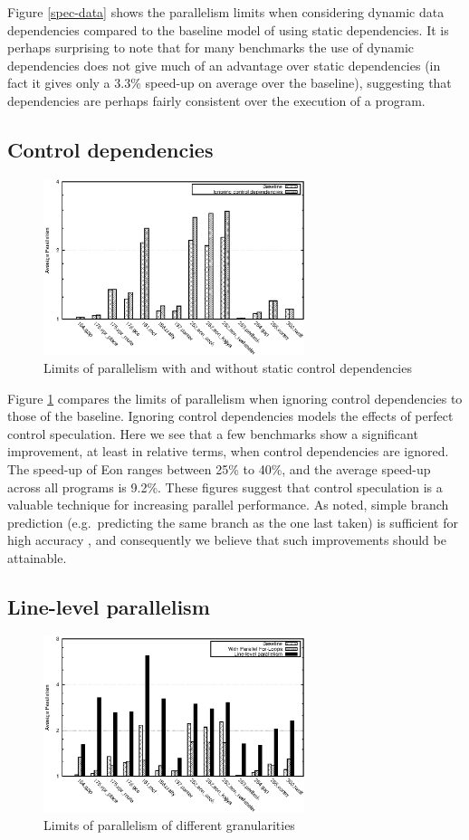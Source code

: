 Figure \ref{spec-data} shows the parallelism limits when considering dynamic data dependencies compared to the baseline model of using static dependencies.
It is perhaps surprising to note that for many benchmarks the use of dynamic dependencies does not give much of an advantage over static dependencies (in fact it gives only a 3.3\% speed-up on average over the baseline), suggesting that dependencies are perhaps fairly consistent over the execution of a program.

\subsection{Control dependencies}

\begin{figure}
 \centering
 \includegraphics[width=3in]{spec-ctl}
 \caption{Limits of parallelism with and without static control dependencies}
 \label{spec-ctl}
\end{figure}

Figure \ref{spec-ctl} compares the limits of parallelism when ignoring control dependencies to those of the baseline.
Ignoring control dependencies models the effects of perfect control speculation.
Here we see that a few benchmarks show a significant improvement, at least in relative terms, when control dependencies are ignored.
The speed-up of Eon ranges between 25\% to 40\%, and the average speed-up across all programs is 9.2\%.
These figures suggest that control speculation is a valuable technique for increasing parallel performance.
As noted, simple branch prediction (e.g.\ predicting the same branch as the one last taken) is sufficient for high accuracy \cite{smith98study}, and consequently we believe that such improvements should be attainable.

\subsection{Line-level parallelism}

\begin{figure}
 \centering
 \includegraphics[width=3in]{spec-gran}
 \caption{Limits of parallelism of different granularities}
 \label{spec-gran}
\end{figure}

